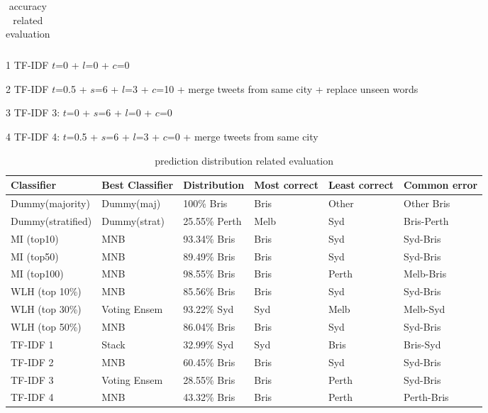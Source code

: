 \documentclass[11pt]{article}
\begin{document}
\begin{table*}[h]
\begin{center}
\begin{tabular}{|l|l|l|l|l|l|l|}
\end{tabular}
\begin{tablenotes}
\begin{flushleft}
    \item[1] TF-IDF $t$=0 + $l$=0 + $c$=0
    \item[2] TF-IDF $t$=0.5 + $s$=6 + $l$=3 + $c$=10 + merge tweets from same city + replace unseen words
    \item[3] TF-IDF 3: $t$=0 + $s$=6 + $l$=0 + $c$=0
    \item[4] TF-IDF 4: $t$=0.5 + $s$=6 + $l$=3 + $c$=0 + merge tweets from same city
\end{flushleft}
\end{tablenotes}
\caption{accuracy related evaluation}\label{table5.1}
 \end{center}
\end{table*}

\begin{table*}[h]
 \begin{center}
\begin{tabular}{|l|l|l|l|l|l|}

      \hline
      Classifier & Best Classifier & Distribution & Most correct & Least correct & Common error\\
      \hline\hline
      Dummy(majority) & Dummy(maj) & 100\% Bris & Bris & Other & Other Bris \\
      \hline
      Dummy(stratified) & Dummy(strat) & 25.55\% Perth & Melb & Syd & Bris-Perth \\ 
      \hline 
      MI (top10) & MNB & 93.34\% Bris & Bris & Syd & Syd-Bris \\ 
      \hline 
      MI (top50) & MNB & 89.49\% Bris & Bris & Syd & Syd-Bris \\ 
      \hline 
      MI (top100) & MNB & 98.55\% Bris & Bris & Perth & Melb-Bris \\ 
      \hline 
      WLH (top 10\%) & MNB & 85.56\% Bris & Bris & Syd & Syd-Bris \\ 
      \hline 
      WLH (top 30\%) & Voting Ensem & 93.22\% Syd & Syd & Melb & Melb-Syd \\
      \hline 
      WLH (top 50\%) & MNB & 86.04\% Bris & Bris & Syd & Syd-Bris \\ 
      \hline 
      TF-IDF 1 & Stack & 32.99\% Syd & Syd & Bris & Bris-Syd \\ 
      \hline 
      TF-IDF 2 & MNB & 60.45\% Bris & Bris & Syd & Syd-Bris \\ 
      \hline 
      TF-IDF 3 & Voting Ensem & 28.55\% Bris & Bris & Perth & Syd-Bris \\ \hline 
      TF-IDF 4 & MNB & 43.32\% Bris & Bris & Perth & Perth-Bris \\ 
      \hline
      
\end{tabular}
\caption{prediction distribution related evaluation}\label{table5.2}
 \end{center}
\end{table*}
\end{document}
